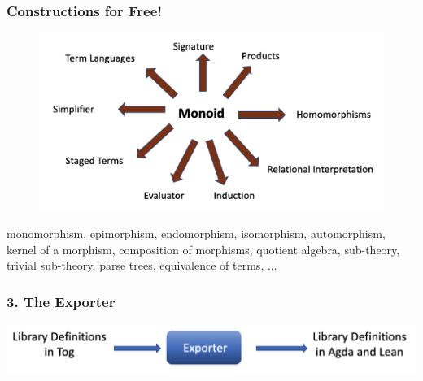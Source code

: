 \documentclass[t,10pt,numbers,fleqn,usenames,xcolor=dvipsnames]{beamer}
\begin{document}
\begin{frame}[fragile] 
\frametitle{Constructions for Free!} 
\begin{figure}
\includegraphics[scale=0.25]{figures/monoid_generation2.png}
\end{figure}
\scriptsize
monomorphism, epimorphism, endomorphism, isomorphism, automorphism, kernel of a morphism, composition of morphisms, quotient algebra, sub-theory, trivial sub-theory, parse trees, equivalence of terms, ...   
\end{frame}


\begin{frame}[fragile] 
\frametitle{3. The Exporter} 
\begin{center}
\includegraphics[scale=0.25]{figures/exporter.png}
\end{center} 
\end{frame}
\end{document}
